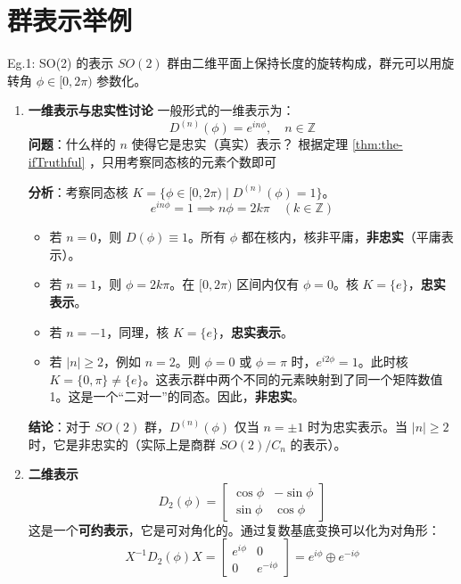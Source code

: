 \section{群表示举例}

\begin{example}{Eg.1: SO(2) 的表示}
    $SO(2)$ 群由二维平面上保持长度的旋转构成，群元可以用旋转角 $\phi \in [0, 2\pi)$ 参数化。
    
    \begin{enumerate}
        \item \textbf{一维表示与忠实性讨论}
    一般形式的一维表示为：
    \begin{equation}
        D^{(n)}(\phi) = e^{in\phi}, \quad n \in \mathbb{Z}
    \end{equation}
    \textbf{问题}：什么样的 $n$ 使得它是忠实（真实）表示？
    根据定理 \ref{thm:the-ifTruthful} ，只用考察同态核的元素个数即可

    \textbf{分析}：考察同态核 $K = \{ \phi \in [0, 2\pi) \mid D^{(n)}(\phi) = 1 \}$。
    \begin{equation}
        e^{in\phi} = 1 \implies n\phi = 2k\pi \quad (k \in \mathbb{Z})
    \end{equation}
    \begin{itemize}
        \item 若 $n=0$，则 $D(\phi) \equiv 1$。所有 $\phi$ 都在核内，核非平庸，\textbf{非忠实}（平庸表示）。
        \item 若 $n=1$，则 $\phi = 2k\pi$。在 $[0, 2\pi)$ 区间内仅有 $\phi=0$。核 $K=\{e\}$，\textbf{忠实表示}。
        \item 若 $n=-1$，同理，核 $K=\{e\}$，\textbf{忠实表示}。
        \item 若 $|n| \ge 2$，例如 $n=2$。则 $\phi = 0$ 或 $\phi = \pi$ 时，$e^{i2\phi}=1$。此时核 $K=\{0, \pi\} \neq \{e\}$。这表示群中两个不同的元素映射到了同一个矩阵数值 1。这是一个“二对一”的同态。因此，\textbf{非忠实}。
    \end{itemize}
    \textbf{结论}：对于 $SO(2)$ 群，$D^{(n)}(\phi)$ 仅当 $n = \pm 1$ 时为忠实表示。当 $|n| \ge 2$ 时，它是非忠实的（实际上是商群 $SO(2)/C_n$ 的表示）。

        \item \textbf{二维表示}
    \begin{equation}
        D_2(\phi) = \begin{bmatrix} \cos\phi & -\sin\phi \\ \sin\phi & \cos\phi \end{bmatrix}
    \end{equation}
    这是一个\textbf{可约表示}，它是可对角化的。通过复数基底变换可以化为对角形：
    \begin{equation}
        X^{-1}D_2(\phi)X = \begin{bmatrix} e^{i\phi} & 0 \\ 0 & e^{-i\phi} \end{bmatrix} = e^{i\phi} \oplus e^{-i\phi}
    \end{equation}


\end{enumerate}
\end{example}
